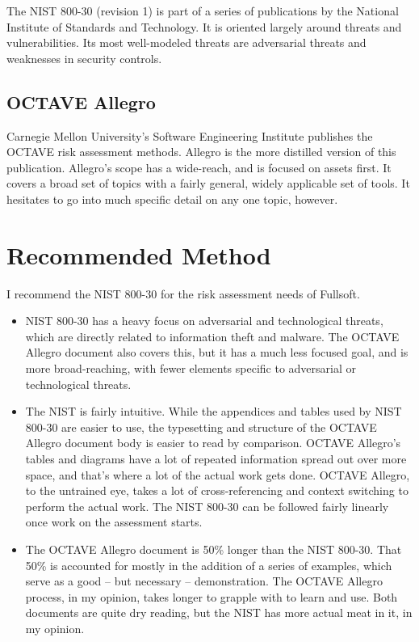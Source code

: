 The NIST 800-30 (revision 1) is part of a series of publications by the
National Institute of Standards and Technology. It is oriented largely
around threats and vulnerabilities. Its most well-modeled threats are
adversarial threats and weaknesses in security controls.

\hypertarget{octave-allegro}{%
\subsection{OCTAVE Allegro}\label{octave-allegro}}

Carnegie Mellon University's Software Engineering Institute publishes
the OCTAVE risk assessment methods. Allegro is the more distilled
version of this publication. Allegro's scope has a wide-reach, and is
focused on assets first. It covers a broad set of topics with a fairly
general, widely applicable set of tools. It hesitates to go into much
specific detail on any one topic, however.

\hypertarget{recommended-method}{%
\section{Recommended Method}\label{recommended-method}}

I recommend the NIST 800-30 for the risk assessment needs of Fullsoft.

\begin{itemize}
\item
  NIST 800-30 has a heavy focus on adversarial and technological
  threats, which are directly related to information theft and malware.
  The OCTAVE Allegro document also covers this, but it has a much less
  focused goal, and is more broad-reaching, with fewer elements specific
  to adversarial or technological threats.
\item
  The NIST is fairly intuitive. While the appendices and tables used by
  NIST 800-30 are easier to use, the typesetting and structure of the
  OCTAVE Allegro document body is easier to read by comparison. OCTAVE
  Allegro's tables and diagrams have a lot of repeated information
  spread out over more space, and that's where a lot of the actual work
  gets done. OCTAVE Allegro, to the untrained eye, takes a lot of
  cross-referencing and context switching to perform the actual work.
  The NIST 800-30 can be followed fairly linearly once work on the
  assessment starts.
\item
  The OCTAVE Allegro document is 50\% longer than the NIST 800-30. That
  50\% is accounted for mostly in the addition of a series of examples,
  which serve as a good -- but necessary -- demonstration. The OCTAVE
  Allegro process, in my opinion, takes longer to grapple with to learn
  and use. Both documents are quite dry reading, but the NIST has more
  actual meat in it, in my opinion.
\end{itemize}

